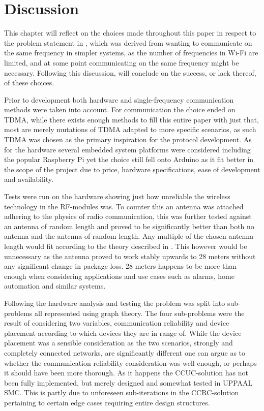 \chapter{Discussion}\label{Discussion}
This chapter will reflect on the choices made throughout this paper in respect to the problem statement in , which was derived from wanting to communicate on the same frequency in simpler systems, as the number of frequencies in Wi-Fi are limited, and at some point communicating on the same frequency might be necessary.
Following this discussion,  will conclude on the success, or lack thereof, of these choices.

\bigskip \noindent
Prior to development both hardware and single-frequency communication methods were taken into account.
For communication the choice ended on TDMA, while there exists enough methods to fill this entire paper with just that, most are merely mutations of TDMA adapted to more specific scenarios, as such TDMA was chosen as the primary inspiration for the protocol development.
As for the hardware several embedded system platforms were considered including the popular Raspberry Pi yet the choice still fell onto Arduino as it fit better in the scope of the project due to price, hardware specifications, ease of development and availability.

Tests were run on the hardware showing just how unreliable the wireless technology in the RF-modules was.
To counter this an antenna was attached adhering to the physics of radio communication, this was further tested against an antenna of random length and proved to be significantly better than both no antenna and the antenna of random length.
Any multiple of the chosen antenna length would fit according to the theory described in .
This however would be unnecessary as the antenna proved to work stably upwards to 28 meters without any significant change in package loss.
28 meters happens to be more than enough when considering applications and use cases such as alarms, home automation and similar systems. 

\bigskip \noindent
Following the hardware analysis and testing the problem was split into sub-problems all represented using graph theory.
The four sub-problems were the result of considering two variables, communication reliability and device placement according to which devices they are in range of.
While the device placement was a sensible consideration as the two scenarios, strongly and completely connected networks, are significantly different one can argue as to whether the communication reliability consideration was well enough, or perhaps it should have been more thorough.
As it happens the CCUC-solution has not been fully implemented, but merely designed and somewhat tested in UPPAAL SMC.
This is partly due to unforeseen sub-iterations in the CCRC-solution pertaining to certain edge cases requiring entire design structures.

